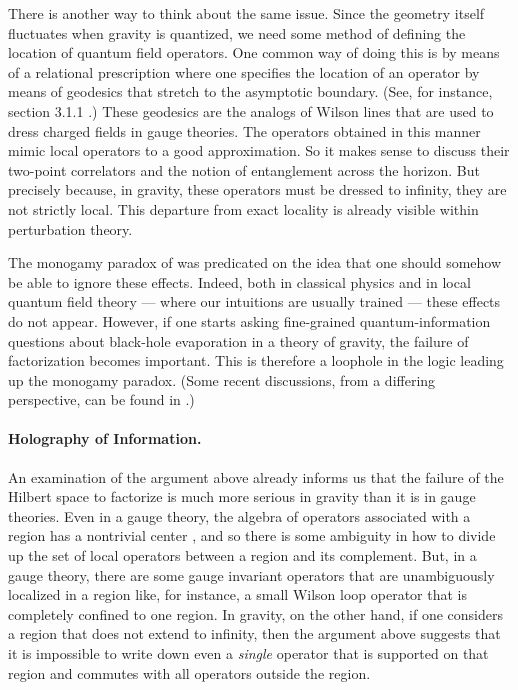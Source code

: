 \documentclass[12pt]{article}
\begin{document}
There is another way to think about the same issue. Since the geometry itself fluctuates when gravity is quantized, we need some method of defining the location of quantum field operators. One common way of doing this is by means of a relational prescription where one specifies the location of an operator by means of geodesics that stretch to the asymptotic boundary. (See, for instance, section 3.1.1 \cite{Papadodimas:2015jra}.) These geodesics are the analogs of Wilson lines that are used to dress charged fields in gauge theories.  The operators obtained in this manner mimic local operators to a good approximation. So it makes sense to discuss their two-point correlators and the notion of entanglement across the horizon. But precisely because, in gravity, these operators must be dressed to infinity, they are not strictly local. This departure from exact locality is already visible within perturbation theory.

The monogamy paradox of \cite{Mathur:2009hf,Almheiri:2012rt} was predicated on the idea that one
should somehow be able to ignore these effects. Indeed, both in classical physics and in local quantum field
theory  --- where our intuitions are usually trained --- these effects do not appear. However, if one
starts asking fine-grained quantum-information questions about black-hole evaporation in a theory of gravity, the failure of factorization becomes important. This is therefore a loophole in the logic leading up the monogamy paradox. (Some recent discussions, from a differing perspective, can be found in \cite{Karlsson:2020uga,Karlsson:2019vlf}.)


\paragraph{Holography of Information.}
An examination of the argument above already informs us that the failure of the Hilbert space to factorize is 
 much more serious in gravity than it is in gauge theories. Even in a gauge theory, the algebra of operators
associated with a region has a nontrivial center \cite{Casini:2013rba,Casini:2014aia,Soni:2015yga,Ghosh:2015iwa}, and so there is some ambiguity in how to divide up the set of local operators between a region and its complement. But, in a gauge theory, there are some gauge invariant operators that are  unambiguously localized in a region like, for instance, a small Wilson loop operator that is completely confined
to one region. In gravity, on the other hand, if one considers a region that does not extend to infinity,
then the argument above suggests that it is impossible to write down even a {\em single} operator that is
supported on that region and commutes with all operators outside the region.
\end{document}
